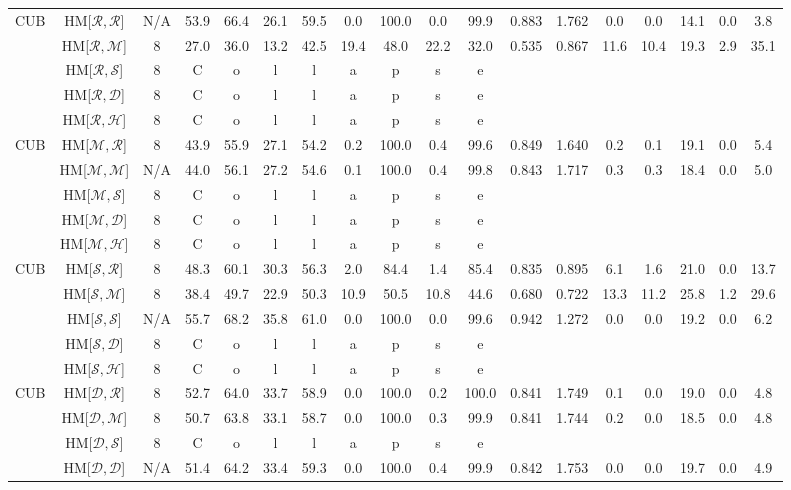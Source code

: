 \begin{table*}
{\begin{tabular}{c|cc|cccc|ccccc|ccccc|c}
\multirow{5}{*}{CUB} & HM{[}$\mathcal{R},\mathcal{R}${]} & N/A & 53.9 & 66.4 & 26.1 & 59.5 & 0.0 & 100.0 & 0.0 & 99.9 & 0.883 & 1.762 & 0.0 & 0.0 & 14.1 & 0.0 & 3.8\tabularnewline
 & HM{[}$\mathcal{R},\mathcal{M}${]} & 8 & 27.0 & 36.0 & 13.2 & 42.5 & 19.4 & 48.0 & 22.2 & 32.0 & 0.535 & 0.867 & 11.6 & 10.4 & 19.3 & 2.9 & 35.1\tabularnewline
 & HM{[}$\mathcal{R},\mathcal{S}${]} & 8 & C & o & l & l & a & p & s & e &  &  &  &  &  &  & \tabularnewline
 & HM{[}$\mathcal{R},\mathcal{D}${]} & 8 & C & o & l & l & a & p & s & e &  &  &  &  &  &  & \tabularnewline
 & HM{[}$\mathcal{R},\mathcal{H}${]} & 8 & C & o & l & l & a & p & s & e &  &  &  &  &  &  & \tabularnewline
\hline 
\multirow{5}{*}{CUB} & HM{[}$\mathcal{M},\mathcal{R}${]} & 8 & 43.9 & 55.9 & 27.1 & 54.2 & 0.2 & 100.0 & 0.4 & 99.6 & 0.849 & 1.640 & 0.2 & 0.1 & 19.1 & 0.0 & 5.4\tabularnewline
 & HM{[}$\mathcal{M},\mathcal{M}${]} & N/A & 44.0 & 56.1 & 27.2 & 54.6 & 0.1 & 100.0 & 0.4 & 99.8 & 0.843 & 1.717 & 0.3 & 0.3 & 18.4 & 0.0 & 5.0\tabularnewline
 & HM{[}$\mathcal{M},\mathcal{S}${]} & 8 & C & o & l & l & a & p & s & e &  &  &  &  &  &  & \tabularnewline
 & HM{[}$\mathcal{M},\mathcal{D}${]} & 8 & C & o & l & l & a & p & s & e &  &  &  &  &  &  & \tabularnewline
 & HM{[}$\mathcal{M},\mathcal{H}${]} & 8 & C & o & l & l & a & p & s & e &  &  &  &  &  &  & \tabularnewline
\hline 
\multirow{5}{*}{CUB} & HM{[}$\mathcal{S},\mathcal{R}${]} & 8 & 48.3 & 60.1 & 30.3 & 56.3 & 2.0 & 84.4 & 1.4 & 85.4 & 0.835 & 0.895 & 6.1 & 1.6 & 21.0 & 0.0 & 13.7\tabularnewline
 & HM{[}$\mathcal{S},\mathcal{M}${]} & 8 & 38.4 & 49.7 & 22.9 & 50.3 & 10.9 & 50.5 & 10.8 & 44.6 & 0.680 & 0.722 & 13.3 & 11.2 & 25.8 & 1.2 & 29.6\tabularnewline
 & HM{[}$\mathcal{S},\mathcal{S}${]} & N/A & 55.7 & 68.2 & 35.8 & 61.0 & 0.0 & 100.0 & 0.0 & 99.6 & 0.942 & 1.272 & 0.0 & 0.0 & 19.2 & 0.0 & 6.2\tabularnewline
 & HM{[}$\mathcal{S},\mathcal{D}${]} & 8 & C & o & l & l & a & p & s & e &  &  &  &  &  &  & \tabularnewline
 & HM{[}$\mathcal{S},\mathcal{H}${]} & 8 & C & o & l & l & a & p & s & e &  &  &  &  &  &  & \tabularnewline
\hline 
\multirow{5}{*}{CUB} & HM{[}$\mathcal{D},\mathcal{R}${]} & 8 & 52.7 & 64.0 & 33.7 & 58.9 & 0.0 & 100.0 & 0.2 & 100.0 & 0.841 & 1.749 & 0.1 & 0.0 & 19.0 & 0.0 & 4.8\tabularnewline
 & HM{[}$\mathcal{D},\mathcal{M}${]} & 8 & 50.7 & 63.8 & 33.1 & 58.7 & 0.0 & 100.0 & 0.3 & 99.9 & 0.841 & 1.744 & 0.2 & 0.0 & 18.5 & 0.0 & 4.8\tabularnewline
 & HM{[}$\mathcal{D},\mathcal{S}${]} & 8 & C & o & l & l & a & p & s & e &  &  &  &  &  &  & \tabularnewline
 & HM{[}$\mathcal{D},\mathcal{D}${]} & N/A & 51.4 & 64.2 & 33.4 & 59.3 & 0.0 & 100.0 & 0.4 & 99.9 & 0.842 & 1.753 & 0.0 & 0.0 & 19.7 & 0.0 & 4.9\tabularnewline

\end{tabular}}
\end{table*}
